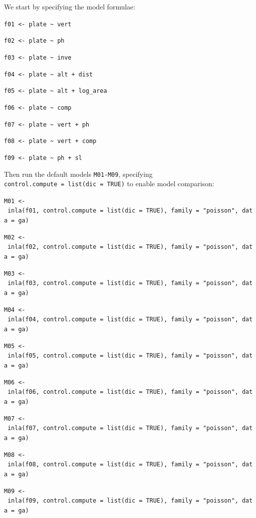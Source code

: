 \documentclass[
]{book}
\begin{document}
We start by specifying the model formulae:

\texttt{f01\ \textless{}-\ plate\ \textasciitilde{}\ vert}

\texttt{f02\ \textless{}-\ plate\ \textasciitilde{}\ ph}

\texttt{f03\ \textless{}-\ plate\ \textasciitilde{}\ inve}

\texttt{f04\ \textless{}-\ plate\ \textasciitilde{}\ alt\ +\ dist}

\texttt{f05\ \textless{}-\ plate\ \textasciitilde{}\ alt\ +\ log\_area}

\texttt{f06\ \textless{}-\ plate\ \textasciitilde{}\ comp}

\texttt{f07\ \textless{}-\ plate\ \textasciitilde{}\ vert\ +\ ph}

\texttt{f08\ \textless{}-\ plate\ \textasciitilde{}\ vert\ +\ comp}

\texttt{f09\ \textless{}-\ plate\ \textasciitilde{}\ ph\ +\ sl}

Then run the default models \texttt{M01-M09}, specifying \texttt{control.compute\ =\ list(dic\ =\ TRUE)} to enable model comparison:

\texttt{M01\ \textless{}-\ inla(f01,\ control.compute\ =\ list(dic\ =\ TRUE),\ family\ =\ "poisson",\ data\ =\ ga)}

\texttt{M02\ \textless{}-\ inla(f02,\ control.compute\ =\ list(dic\ =\ TRUE),\ family\ =\ "poisson",\ data\ =\ ga)}

\texttt{M03\ \textless{}-\ inla(f03,\ control.compute\ =\ list(dic\ =\ TRUE),\ family\ =\ "poisson",\ data\ =\ ga)}

\texttt{M04\ \textless{}-\ inla(f04,\ control.compute\ =\ list(dic\ =\ TRUE),\ family\ =\ "poisson",\ data\ =\ ga)}

\texttt{M05\ \textless{}-\ inla(f05,\ control.compute\ =\ list(dic\ =\ TRUE),\ family\ =\ "poisson",\ data\ =\ ga)}

\texttt{M06\ \textless{}-\ inla(f06,\ control.compute\ =\ list(dic\ =\ TRUE),\ family\ =\ "poisson",\ data\ =\ ga)}

\texttt{M07\ \textless{}-\ inla(f07,\ control.compute\ =\ list(dic\ =\ TRUE),\ family\ =\ "poisson",\ data\ =\ ga)}

\texttt{M08\ \textless{}-\ inla(f08,\ control.compute\ =\ list(dic\ =\ TRUE),\ family\ =\ "poisson",\ data\ =\ ga)}

\texttt{M09\ \textless{}-\ inla(f09,\ control.compute\ =\ list(dic\ =\ TRUE),\ family\ =\ "poisson",\ data\ =\ ga)}
\end{document}
